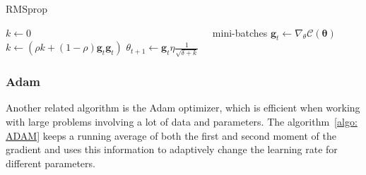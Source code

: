 \documentclass[english,notitlepage,reprint,nofootinbib]{revtex4-2}  %
\begin{document}
\begin{algorithm}[H]
    \caption{RMSprop}\label{algo: RMSprop}
    \begin{algorithmic}
         
        \State $k \leftarrow 0$
        \State $\:\:\:\:\:\:\:\:\:\:\:\:\:\:\:\:\:\:\:\:\:\:\:\:\:\:\:\:\:\:\:\:\:\:\:\:\:\:\:\:\:\:\:\:\:\:\:\:\:\:\:\:\:\:\:\:\:\:\:\:\:\:\:\:\:\:\:\:\:\:\:\:\:\:\:\:\:\:\:\:$ mini-batches
        \State $\mathbf{g}_t \leftarrow \nabla_\theta \mathcal{C}(\boldsymbol{\theta})$
        \State $k \leftarrow (\rho k + (1 - \rho)\mathbf{g}_t \mathbf{g}_t)$
        \State $\theta_{t+1} \leftarrow \mathbf{g}_t \eta \frac{1}{\sqrt{\delta + k}}$
    \end{algorithmic}
\end{algorithm}

\subsubsection*{Adam} %
Another related algorithm is the Adam optimizer, which is efficient when working with large problems involving a lot of data and parameters. 
The algorithm~\ref{algo: ADAM} keeps a running average of both the first and second moment of the gradient and uses this information to adaptively change the learning rate for different parameters. 
\end{document}
